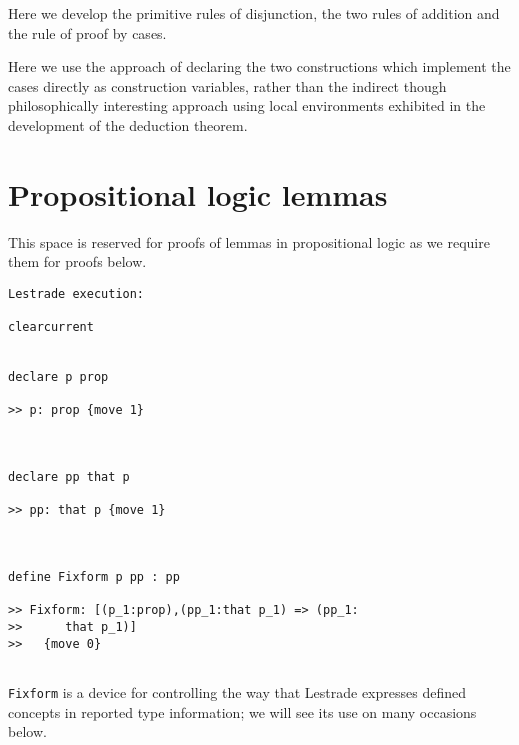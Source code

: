 \documentclass[12pt]{article}
\begin{document}
Here we develop the primitive rules of disjunction, the two rules of addition and the rule of proof by cases.

Here we use the approach of declaring the two constructions which implement the cases directly as construction variables, rather than the indirect though philosophically interesting approach using local environments exhibited in the development of the deduction theorem.

\section{Propositional logic lemmas}

This space is reserved for proofs of lemmas in propositional logic as we require them for proofs below.

\begin{verbatim}Lestrade execution:

clearcurrent


declare p prop

>> p: prop {move 1}



declare pp that p

>> pp: that p {move 1}



define Fixform p pp : pp

>> Fixform: [(p_1:prop),(pp_1:that p_1) => (pp_1:
>>      that p_1)]
>>   {move 0}


\end{verbatim}

{\tt Fixform} is a device for controlling the way that Lestrade expresses defined concepts in reported type information; we will see its use on many occasions below.
\end{document}
